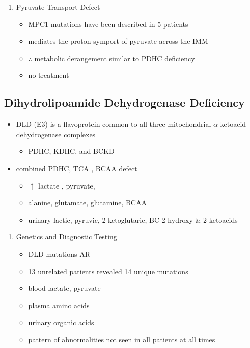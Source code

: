 \documentclass{scrartcl}
\begin{document}
\begin{enumerate}
\item Pyruvate Transport Defect
\label{sec:org752abf6}
\begin{itemize}
\item MPC1 mutations have been described in 5 patients
\item mediates the proton symport of pyruvate across the IMM
\item \(\therefore\) metabolic derangement similar to PDHC deficiency
\item no treatment
\end{itemize}
\end{enumerate}

\subsection{Dihydrolipoamide Dehydrogenase Deficiency}
\label{sec:orgdfd6db9}
\begin{itemize}
\item DLD (E3) is a flavoprotein common to all three mitochondrial
\(\alpha\)-ketoacid dehydrogenase complexes
\begin{itemize}
\item PDHC, KDHC, and BCKD
\end{itemize}
\item combined PDHC, TCA , BCAA defect
\begin{itemize}
\item \(\uparrow\) lactate , pyruvate,
\item alanine, glutamate, glutamine, BCAA
\item urinary lactic, pyruvic, 2-ketoglutaric, BC 2-hydroxy \& 2-ketoacids
\end{itemize}
\end{itemize}

\begin{enumerate}
\item Genetics and Diagnostic Testing
\label{sec:orgdea39a2}
\begin{itemize}
\item DLD mutations AR
\item 13 unrelated patients revealed 14 unique mutations
\item blood lactate, pyruvate
\item plasma amino acids
\item urinary organic acids
\item pattern of abnormalities not seen in all patients at all times
\end{itemize}
\end{enumerate}
\end{document}

